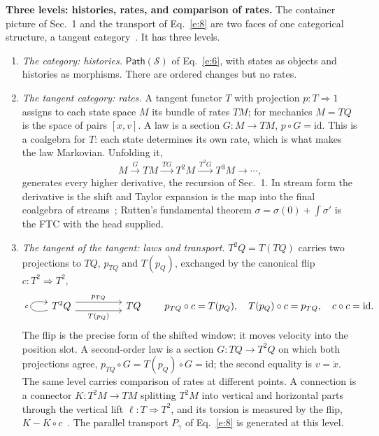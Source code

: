 \documentclass[10pt]{article}
\newcommand{\Path}{\mathsf{Path}}
\begin{document}
\smallskip
\noindent\textbf{Three levels: histories, rates, and comparison of rates.} The container picture of Sec.~1 and the transport of Eq.~\eqref{e:8} are two faces of one categorical structure, a tangent category~\cite{rosicky,cockett2014}. It has three levels.
\begin{enumerate}\itemsep2pt
\item \emph{The category: histories.} $\Path(\mathcal S)$ of Eq.~\eqref{e:6}, with states as objects and histories as morphisms. There are ordered changes but no rates.
\item \emph{The tangent category: rates.} A tangent functor $T$ with projection $p:T\Rightarrow1$ assigns to each state space $M$ its bundle of rates $TM$; for mechanics $M=TQ$ is the space of pairs $[x,v]$. A law is a section $G:M\to TM$, $p\circ G=\mathrm{id}$. This is a coalgebra for $T$: each state determines its own rate, which is what makes the law Markovian. Unfolding it,
\begin{equation*}
M\xrightarrow{\ G\ }TM\xrightarrow{\ TG\ }T^2M\xrightarrow{\ T^2G\ }T^3M\longrightarrow\cdots,
\end{equation*}
generates every higher derivative, the recursion of Sec.~1. In stream form the derivative is the shift and Taylor expansion is the map into the final coalgebra of streams~\cite{pavlovic,rutten}; Rutten's fundamental theorem $\sigma=\sigma(0)+\int\sigma'$ is the FTC with the head supplied.
\item \emph{The tangent of the tangent: laws and transport.} $T^2Q=T(TQ)$ carries two projections to $TQ$, $p_{TQ}$ and $T(p_Q)$, exchanged by the canonical flip $c:T^2\Rightarrow T^2$,
\begin{equation*}
\begin{tikzcd}[column sep=huge]
T^2Q \arrow[loop left,"c"] \arrow[r,shift left=1ex,"p_{TQ}"] \arrow[r,shift right=1ex,"T(p_Q)"'] & TQ
\end{tikzcd}
\qquad p_{TQ}\circ c=T(p_Q),\quad T(p_Q)\circ c=p_{TQ},\quad c\circ c=\mathrm{id}.
\end{equation*}
The flip is the precise form of the shifted window: it moves velocity into the position slot. A second-order law is a section $G:TQ\to T^2Q$ on which both projections agree, $p_{TQ}\circ G=T(p_Q)\circ G=\mathrm{id}$; the second equality is $v=\dot x$. The same level carries comparison of rates at different points. A connection is a connector $K:T^2M\to TM$ splitting $T^2M$ into vertical and horizontal parts through the vertical lift $\ell:T\Rightarrow T^2$, and its torsion is measured by the flip, $K-K\circ c$~\cite{cockett2017}. The parallel transport $P_\gamma$ of Eq.~\eqref{e:8} is generated at this level.
\end{enumerate}
\end{document}

